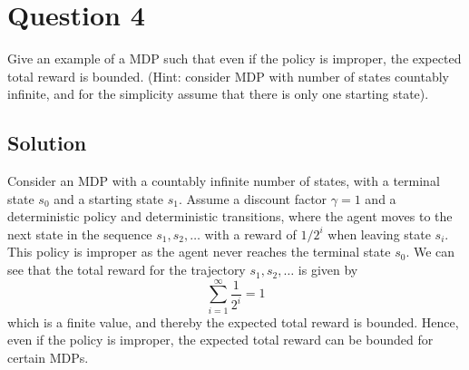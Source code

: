 \section*{Question 4}

Give an example of a MDP such that even if the policy is improper, the expected total reward is bounded.
(Hint: consider MDP with number of states countably infinite, and for the simplicity assume that there is only one starting state).

\subsection*{Solution}

Consider an MDP with a countably infinite number of states, with a terminal state \( s_0 \) and a starting state \( s_1 \).
Assume a discount factor \( \gamma = 1 \) and a deterministic policy and deterministic transitions, where the agent moves to the next state in the sequence \( s_1, s_2, \dots \) with a reward of \( 1/2^i \) when leaving state \( s_i \).
This policy is improper as the agent never reaches the terminal state \( s_0 \).
We can see that the total reward for the trajectory \( s_1, s_2, \dots \) is given by
\[
    \sum_{i=1}^{\infty} \frac{1}{2^i} = 1
\]
which is a finite value, and thereby the expected total reward is bounded.
Hence, even if the policy is improper, the expected total reward can be bounded for certain MDPs.
